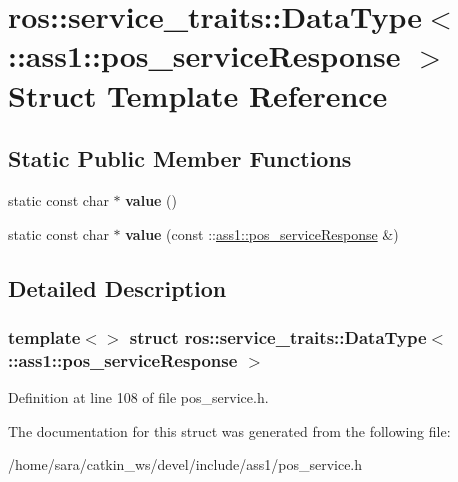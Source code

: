\hypertarget{structros_1_1service__traits_1_1DataType_3_01_1_1ass1_1_1pos__serviceResponse_01_4}{}\section{ros\+:\+:service\+\_\+traits\+:\+:Data\+Type$<$ \+:\+:ass1\+:\+:pos\+\_\+service\+Response $>$ Struct Template Reference}
\label{structros_1_1service__traits_1_1DataType_3_01_1_1ass1_1_1pos__serviceResponse_01_4}
\subsection*{Static Public Member Functions}
\begin{DoxyCompactItemize}
\item 
\mbox{\label{structros_1_1service__traits_1_1DataType_3_01_1_1ass1_1_1pos__serviceResponse_01_4_a4046e6b0fb4f06ec3f08f426c01118f3}} 
static const char $\ast$ {\bfseries value} ()
\item 
\mbox{\label{structros_1_1service__traits_1_1DataType_3_01_1_1ass1_1_1pos__serviceResponse_01_4_a50c958e276f8a1df0ef9fde04bb4d706}} 
static const char $\ast$ {\bfseries value} (const \+::\hyperlink{structass1_1_1pos__serviceResponse__}{ass1\+::pos\+\_\+service\+Response} \&)
\end{DoxyCompactItemize}


\subsection{Detailed Description}
\subsubsection*{template$<$$>$\newline
struct ros\+::service\+\_\+traits\+::\+Data\+Type$<$ \+::ass1\+::pos\+\_\+service\+Response $>$}



Definition at line 108 of file pos\+\_\+service.\+h.



The documentation for this struct was generated from the following file\+:\begin{DoxyCompactItemize}
\item 
/home/sara/catkin\+\_\+ws/devel/include/ass1/pos\+\_\+service.\+h\end{DoxyCompactItemize}
